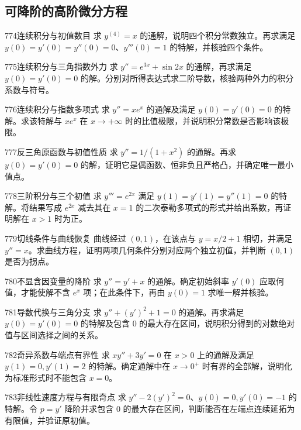 \subsection{可降阶的高阶微分方程}
\begin{exercise}{774}{连续积分与初值数目}
求 $y^{(4)}=x$ 的通解，说明四个积分常数独立。再求满足 $y(0)=y'(0)=y''(0)=0$、$y'''(0)=1$ 的特解，并核验四个条件。
\end{exercise}
\begin{exercise}{775}{连续积分与三角指数外力}
求 $y''=e^{3x}+\sin2x$ 的通解，再求满足 $y(0)=y'(0)=0$ 的解。分别对所得表达式求二阶导数，核验两种外力的积分系数与符号。
\end{exercise}
\begin{exercise}{776}{连续积分与指数多项式}
求 $y''=xe^x$ 的通解及满足 $y(0)=y'(0)=0$ 的特解。求该特解与 $xe^x$ 在 $x\to+\infty$ 时的比值极限，并说明积分常数是否影响该极限。
\end{exercise}
\begin{exercise}{777}{反三角原函数与初值性质}
求 $y''=1/(1+x^2)$ 的通解。再求 $y(0)=y'(0)=0$ 的解，证明它是偶函数、恒非负且严格凸，并确定唯一最小值点。
\end{exercise}
\begin{exercise}{778}{三阶积分与三个初值}
求 $y'''=e^{2x}$ 满足 $y(1)=y'(1)=y''(1)=0$ 的特解。将结果写成 $e^{2x}$ 减去其在 $x=1$ 的二次泰勒多项式的形式并给出系数，再证明解在 $x>1$ 时为正。
\end{exercise}
\begin{exercise}{779}{切线条件与曲线恢复}
曲线经过 $(0,1)$，在该点与 $y=x/2+1$ 相切，并满足 $y''=x$。求曲线方程，证明两项几何条件分别对应两个独立初值，并判断 $(0,1)$ 是否为拐点。
\end{exercise}
\begin{exercise}{780}{不显含因变量的降阶}
求 $y''=y'+x$ 的通解。确定初始斜率 $y'(0)$ 应取何值，才能使解不含 $e^x$ 项；在此条件下，再由 $y(0)=1$ 求唯一解并核验。
\end{exercise}
\begin{exercise}{781}{导数代换与三角分支}
求 $y''+(y')^2+1=0$ 的通解。再求满足 $y(0)=y'(0)=0$ 的特解及包含 $0$ 的最大存在区间，说明积分得到的对数绝对值与区间选择之间的关系。
\end{exercise}
\begin{exercise}{782}{奇异系数与端点有界性}
求 $xy''+3y'=0$ 在 $x>0$ 上的通解及满足 $y(1)=0,y'(1)=2$ 的特解。确定通解中在 $x\to0^+$ 时有界的全部解，说明化为标准形式时不能包含 $x=0$。
\end{exercise}
\begin{exercise}{783}{非线性速度方程与有限奇点}
求 $y''-2(y')^2=0$、$y(0)=0,y'(0)=-1$ 的特解。令 $p=y'$ 降阶并求包含 $0$ 的最大存在区间，判断能否在左端点连续延拓为有限值，并验证原初值。
\end{exercise}
